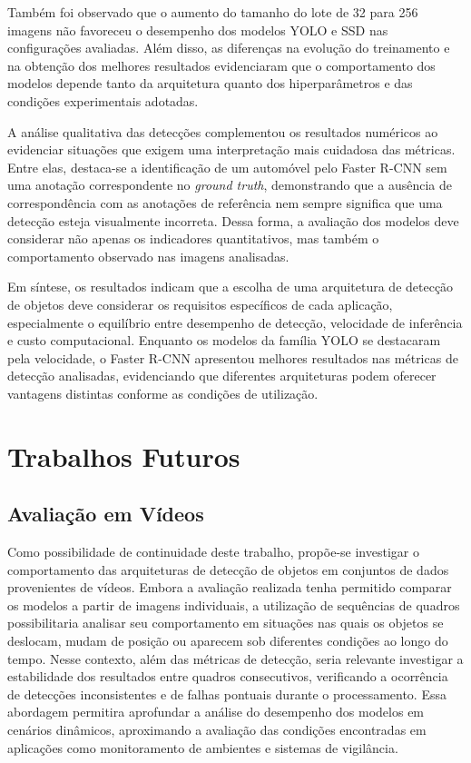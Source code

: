 Também foi observado que o aumento do tamanho do lote de 32 para 256 imagens não favoreceu
o desempenho dos modelos YOLO e SSD nas configurações avaliadas. Além disso, as diferenças
na evolução do treinamento e na obtenção dos melhores resultados evidenciaram que o
comportamento dos modelos depende tanto da arquitetura quanto dos hiperparâmetros e das
condições experimentais adotadas.

A análise qualitativa das detecções complementou os resultados numéricos ao evidenciar
situações que exigem uma interpretação mais cuidadosa das métricas. Entre elas, destaca-se
a identificação de um automóvel pelo Faster R-CNN sem uma anotação correspondente no
\textit{ground truth}, demonstrando que a ausência de correspondência com as anotações de
referência nem sempre significa que uma detecção esteja visualmente incorreta. Dessa forma,
a avaliação dos modelos deve considerar não apenas os indicadores quantitativos, mas também
o comportamento observado nas imagens analisadas.

Em síntese, os resultados indicam que a escolha de uma arquitetura de detecção de objetos
deve considerar os requisitos específicos de cada aplicação, especialmente o equilíbrio
entre desempenho de detecção, velocidade de inferência e custo computacional. Enquanto os
modelos da família YOLO se destacaram pela velocidade, o Faster R-CNN apresentou melhores
resultados nas métricas de detecção analisadas, evidenciando que diferentes arquiteturas
podem oferecer vantagens distintas conforme as condições de utilização.

\section{Trabalhos Futuros}
\label{sec:trabalhos-futuros}

\subsection{Avaliação em Vídeos}
\label{subsec:avaliacao-videos}

Como possibilidade de continuidade deste trabalho, propõe-se investigar o comportamento das
arquiteturas de detecção de objetos em conjuntos de dados provenientes de vídeos. Embora a
avaliação realizada tenha permitido comparar os modelos a partir de imagens individuais, a
utilização de sequências de quadros possibilitaria analisar seu comportamento em situações
nas quais os objetos se deslocam, mudam de posição ou aparecem sob diferentes condições ao
longo do tempo. Nesse contexto, além das métricas de detecção, seria relevante investigar
a estabilidade dos resultados entre quadros consecutivos, verificando a ocorrência de
detecções inconsistentes e de falhas pontuais durante o processamento. Essa abordagem
permitira aprofundar a análise do desempenho dos modelos em cenários dinâmicos,
aproximando a avaliação das condições encontradas em aplicações como monitoramento de
ambientes e sistemas de vigilância.

